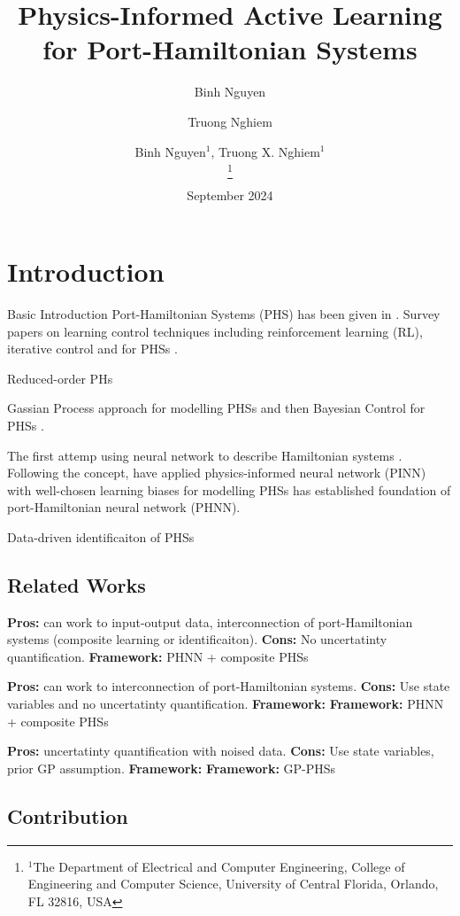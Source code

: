 \documentclass[letterpaper, 10 pt, conference]{ieeeconf}
\title{\LARGE \bf Physics-Informed Active Learning for Port-Hamiltonian Systems}
\author{Binh Nguyen$^{1}$, Truong X. Nghiem$^{1}$
\author[1]{Binh Nguyen}
\author[2]{Truong Nghiem}
\thanks{$^1$The  Department of Electrical and Computer Engineering, College of Engineering and Computer Science, University of Central Florida, Orlando, FL 32816, USA}
}
\date{September 2024}
\begin{document}
\maketitle


\begin{abstract}
\end{abstract}

\section{Introduction}

Basic Introduction Port-Hamiltonian Systems (PHS) has been given in \cite{schaftPortHamiltonianSystemsTheory2014}. Survey papers on learning control techniques including reinforcement learning (RL), iterative control and for PHSs 
\cite{nageshraoPortHamiltonianSystemsAdaptive2016,rashadTwentyYearsDistributed2020,cherifiOverviewRecentMachine2020}. 

Reduced-order PHs \cite{wuReducedOrderLQG2021,schwerdtnerOptimizationbasedModelOrder2023}


Gassian Process approach for modelling PHSs
\cite{beckersGaussianProcessPortHamiltonian2022,beckersLearningSwitchingPortHamiltonian2023} and then Bayesian Control for PHSs \cite{beckersDataDrivenBayesianControl2023a}.

The first attemp using neural network to describe Hamiltonian systems
\cite{greydanusHamiltonianNeuralNetworks2019a}. 
Following the concept,
\cite{nearyCompositionalLearningDynamical2023,eidnesPseudoHamiltonianNeuralNetworks2023,desaiPortHamiltonianNeuralNetworks2021,duongPortHamiltonianNeuralODE2024} have applied physics-informed neural network (PINN) with well-chosen learning biases for modelling PHSs has established foundation of port-Hamiltonian neural network (PHNN).

Data-driven identificaiton of PHSs 
\cite{rettbergDatadrivenIdentificationLatent2024,otterdijkLearningSubsystemDynamics2024}

\subsection{Related Works}

\noindent\cite{otterdijkLearningSubsystemDynamics2024} {\bf Pros:} can work to input-output data, interconnection of port-Hamiltonian systems (composite learning or identificaiton). {\bf Cons:} No uncertatinty quantification. {\bf Framework:} PHNN + composite PHSs

\noindent\cite{nearyCompositionalLearningDynamical2023} {\bf Pros:} can work to interconnection of port-Hamiltonian systems. {\bf Cons:} Use state variables and no uncertatinty quantification. {\bf Framework:} {\bf Framework:} PHNN + composite PHSs

\noindent\cite{beckersGaussianProcessPortHamiltonian2022} {\bf Pros:} uncertatinty quantification with noised data. {\bf Cons:} Use state variables, prior GP assumption. {\bf Framework:} {\bf Framework:} GP-PHSs

\subsection{Contribution}







\end{document}

